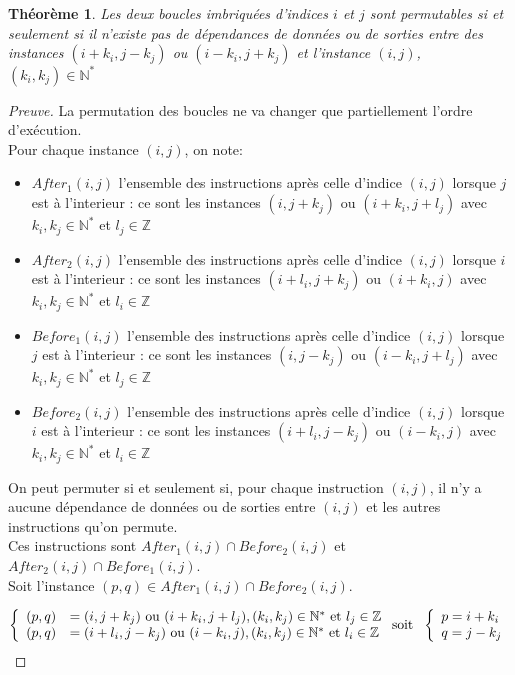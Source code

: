 \documentclass{article}
\newtheorem*{theorem}{Théorème}
\begin{document}
\newpage

\begin{theorem}
Les deux boucles imbriquées d'indices $i$ et $j$ sont permutables si et seulement si il n'existe pas de dépendances de données ou de sorties entre des instances $(i+k_i, j-k_j)$ ou $(i-k_i, j+k_j)$ et l'instance $(i,j)$, $(k_i, k_j) \in \mathbb{N}^*$
\end{theorem}

\begin{proof}[Preuve]
La permutation des boucles ne va changer que partiellement l'ordre d'exécution.\\
Pour chaque instance $(i,j)$, on note:
\begin{itemize}
\item $After_{1}(i,j)$ l'ensemble des instructions après celle d'indice $(i,j)$ lorsque $j$ est à l'interieur : ce sont les instances $(i,j+k_j)$ ou $(i+k_i,j+l_j)$ avec $k_i,k_j \in \mathbb{N}^*$ et $l_j \in \mathbb{Z}$
\item $After_{2}(i,j)$ l'ensemble des instructions après celle d'indice $(i,j)$ lorsque $i$ est à l'interieur : ce sont les instances $(i+l_i,j+k_j)$ ou $(i+k_i,j)$ avec $k_i,k_j \in \mathbb{N}^*$ et $l_i \in \mathbb{Z}$
\item $Before_{1}(i,j)$ l'ensemble des instructions après celle d'indice $(i,j)$ lorsque $j$ est à l'interieur : ce sont les instances $(i,j-k_j)$ ou $(i-k_i,j+l_j)$ avec $k_i,k_j \in \mathbb{N}^*$ et $l_j \in \mathbb{Z}$
\item $Before_{2}(i,j)$ l'ensemble des instructions après celle d'indice $(i,j)$ lorsque $i$ est à l'interieur : ce sont les instances $(i+l_i,j-k_j)$ ou $(i-k_i,j)$ avec $k_i,k_j \in \mathbb{N}^*$ et $l_i \in \mathbb{Z}$
\end{itemize}

On peut permuter si et seulement si, pour chaque instruction $(i,j)$, il n'y a aucune dépendance de données ou de sorties entre $(i,j)$ et les autres instructions qu'on permute.\\

Ces instructions sont $After_{1}(i,j) \cap Before_{2}(i,j)$ et $After_{2}(i,j) \cap Before_{1}(i,j)$.\\

Soit l'instance $(p,q) \in After_{1}(i,j) \cap Before_{2}(i,j)$.

\[
\left\{
    \begin{array}{ll}
        (p,q) &= (i,j+k_j) \mbox{ ou } (i+k_i,j+l_j), (k_i,k_j) \in \mathbb{N}^*$ et $l_j \in \mathbb{Z}\\
        (p,q) &= (i+l_i,j-k_j) \mbox{ ou } (i-k_i,j), (k_i,k_j) \in \mathbb{N}^*$ et $l_i \in \mathbb{Z}
    \end{array}
\right.
\mathrm{soit} ~~
\left\{
    \begin{array}{l}
        p = i+k_i  \\
        q = j-k_j
    \end{array}
\right.
\]


\end{proof}
\end{document}
